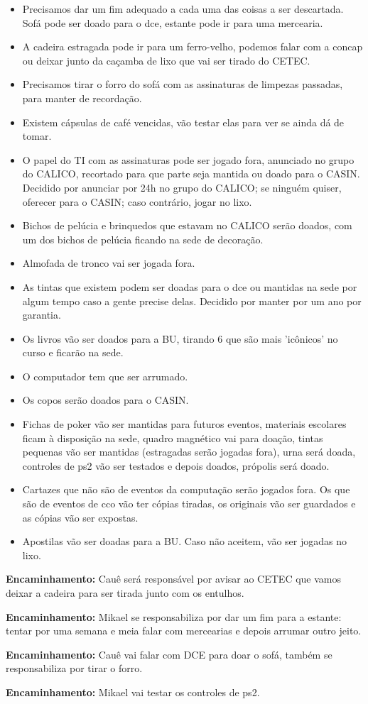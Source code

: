 \documentclass{ata-calico}
\begin{document}
\begin{itemize}
\item Precisamos dar um fim adequado a cada uma das coisas a ser descartada. Sofá pode ser doado para o dce, estante pode ir para uma mercearia.
\item A cadeira estragada pode ir para um ferro-velho, podemos falar com a concap ou deixar junto da caçamba de lixo que vai ser tirado do CETEC.
\item Precisamos tirar o forro do sofá com as assinaturas de limpezas passadas, para manter de recordação.
\item Existem cápsulas de café vencidas, vão testar elas para ver se ainda dá de tomar.
\item O papel do TI com as assinaturas pode ser jogado fora, anunciado no grupo do CALICO, recortado para que parte seja mantida ou doado para o CASIN. Decidido por anunciar por 24h no grupo do CALICO; se ninguém quiser, oferecer para o CASIN; caso contrário, jogar no lixo.
\item Bichos de pelúcia e brinquedos que estavam no CALICO serão doados, com um dos bichos de pelúcia ficando na sede de decoração.
\item Almofada de tronco vai ser jogada fora.
\item As tintas que existem podem ser doadas para o dce ou mantidas na sede por algum tempo caso a gente precise delas. Decidido por manter por um ano por garantia.
\item Os livros vão ser doados para a BU, tirando 6 que são mais 'icônicos' no curso e ficarão na sede.
\item O computador tem que ser arrumado.
\item Os copos serão doados para o CASIN.
\item Fichas de poker vão ser mantidas para futuros eventos, materiais escolares ficam à disposição na sede, quadro magnético vai para doação, tintas pequenas vão ser mantidas (estragadas serão jogadas fora), urna será doada, controles de ps2 vão ser testados e depois doados, própolis será doado.
\item Cartazes que não são de eventos da computação serão jogados fora. Os que são de eventos de cco vão ter cópias tiradas, os originais vão ser guardados e as cópias vão ser expostas.
\item Apostilas vão ser doadas para a BU. Caso não aceitem, vão ser jogadas no lixo.
\end{itemize}

\textbf{Encaminhamento:} Cauê será responsável por avisar ao CETEC que vamos deixar a cadeira para ser tirada junto com os entulhos.

\textbf{Encaminhamento:} Mikael se responsabiliza por dar um fim para a estante: tentar por uma semana e meia falar com mercearias e depois arrumar outro jeito.

\textbf{Encaminhamento:} Cauê vai falar com DCE para doar o sofá, também se responsabiliza por tirar o forro.

\textbf{Encaminhamento:} Mikael vai testar os controles de ps2.

\end{document}
